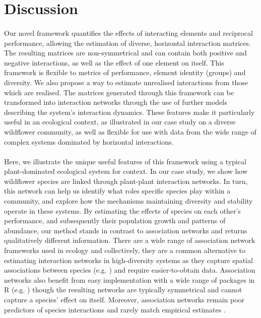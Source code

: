 \documentclass[a4,12pt]{article}
\begin{document}
\section{Discussion}
    



    \paragraph{} 
    Our novel framework quantifies the effects of interacting elements and reciprocal performance, allowing the estimation of diverse, horizontal interaction matrices. The resulting matrices are non-symmetrical and can contain both positive and negative interactions, as well as the effect of one element on itself. This framework is flexible to metrics of performance, element identity (groups) and diversity. We also propose a way to estimate unrealised interactions from those which are realised. The matrices generated through this framework can be transformed into interaction networks through the use of further models describing the system's interaction dynamics. These features make it particularly useful in an ecological context, as illustrated in our case study on a diverse wildflower community, as well as flexible for use with data from the wide range of complex systems dominated by horizontal interactions.

    \paragraph{}
    Here, we illustrate the unique useful features of this framework using a typical plant-dominated ecological system for context. In our case study, we show how wildflower species are linked through  plant-plant interaction networks. In turn, this network can help us identify what roles specific species play within a community, and explore how the mechanisms maintaining diversity and stability operate in these systems. By estimating the effects of species on each other's performance, and subsequently their population growth and patterns of abundance, our method stands in contrast to association networks and returns qualitatively different information. There are a wide range of association network frameworks used in ecology \parencite{} and collectively, they are a common alternative to estimating interaction networks in high-diversity systems as they capture spatial associations between species (e.g. \cite{Saiz2011}) and require easier-to-obtain data. Association networks also benefit from easy implementation with a wide range of packages in R (e.g. \cite{Griffith2016}) though the resulting networks are typically symmetrical and cannot capture a species' effect on itself. Moreover, association networks remain poor predictors of species interactions and rarely match empirical estimates \parencite{Sander2017,Barner2018, Thurman2019, Blanchet2020}.
\end{document}
